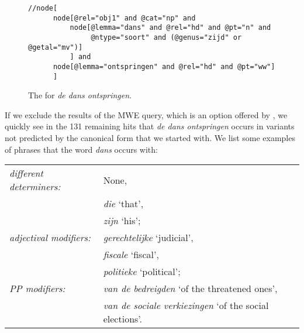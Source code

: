 \documentclass[output=paper,colorlinks,citecolor=brown]{langscibook}
\begin{document}
\begin{figure}
\begin{verbatim}
//node[
      node[@rel="obj1" and @cat="np" and 
          node[@lemma="dans" and @rel="hd" and @pt="n" and 
               @ntype="soort" and (@genus="zijd" or @getal="mv")]
          ] and 
      node[@lemma="ontspringen" and @rel="hd" and @pt="ww"]
      ] 
\end{verbatim}
    \caption{The {\nearmissquery} for \textit{de dans ontspringen}.} \label{dedansontspringennearmiss}
\end{figure}

If we exclude the results of the MWE query, which is an option offered by {\mwefinder}, we quickly see in the 131 remaining hits that \textit{de dans ontspringen} occurs in variants not predicted by the canonical form that we started with. We list some examples of phrases that the word \textit{dans} occurs with:\smallskip\\


\noindent \begin{tabular}{@{}ll@{}}
    \textit{different determiners:}  & None,\\
                            & \textit{die} `that',\\
                            & \textit{zijn} `his';\\[\itemsep]
    \textit{adjectival modifiers:}   & \textit{gerechtelijke} `judicial', \\
                            & \textit{fiscale} `fiscal',\\
                            & \textit{politieke} `political';\\[\itemsep]
    \textit{PP modifiers:} & \textit{van de bedreigden} `of the threatened ones', \\
    & \textit{van de sociale verkiezingen} `of the social elections'.\\[\itemsep]
\end{tabular}\smallskip\\
\end{document}
